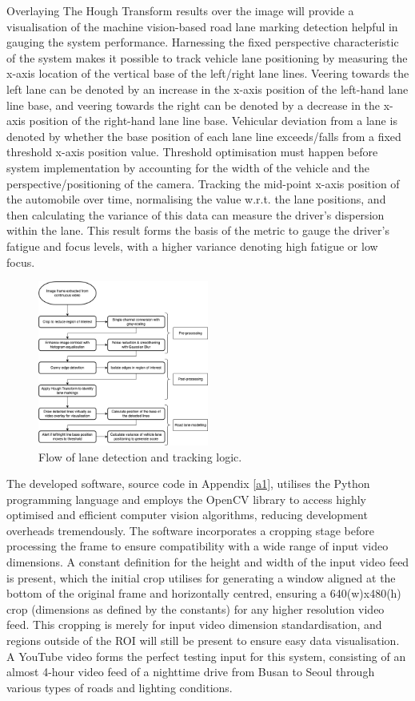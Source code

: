 \documentclass[9pt,conference]{IEEEtran}
\begin{document}
Overlaying The Hough Transform results over the image will provide a visualisation of the machine vision-based road lane marking detection helpful in gauging the system performance. Harnessing the fixed perspective characteristic of the system makes it possible to track vehicle lane positioning by measuring the x-axis location of the vertical base of the left/right lane lines. Veering towards the left lane can be denoted by an increase in the x-axis position of the left-hand lane line base, and veering towards the right can be denoted by a decrease in the x-axis position of the right-hand lane line base. Vehicular deviation from a lane is denoted by whether the base position of each lane line exceeds/falls from a fixed threshold x-axis position value. Threshold optimisation must happen before system implementation by accounting for the width of the vehicle and the perspective/positioning of the camera. Tracking the mid-point x-axis position of the automobile over time, normalising the value w.r.t. the lane positions, and then calculating the variance of this data can measure the driver's dispersion within the lane. This result forms the basis of the metric to gauge the driver's fatigue and focus levels, with a higher variance denoting high fatigue or low focus.

\begin{figure}[htbp]
    \centerline{\includegraphics[width=0.5\textwidth]{assets/lane-detection-flow.png}}
    \caption{Flow of lane detection and tracking logic.}
    \label{f1}
\end{figure}

The developed software, source code in Appendix \ref{a1}, utilises the Python programming language and employs the OpenCV library to access highly optimised and efficient computer vision algorithms, reducing development overheads tremendously. The software incorporates a cropping stage before processing the frame to ensure compatibility with a wide range of input video dimensions. A constant definition for the height and width of the input video feed is present, which the initial crop utilises for generating a window aligned at the bottom of the original frame and horizontally centred, ensuring a 640(w)x480(h) crop (dimensions as defined by the constants) for any higher resolution video feed. This cropping is merely for input video dimension standardisation, and regions outside of the ROI will still be present to ensure easy data visualisation. A YouTube video \cite{b8} forms the perfect testing input for this system, consisting of an almost 4-hour video feed of a nighttime drive from Busan to Seoul through various types of roads and lighting conditions.
\end{document}
